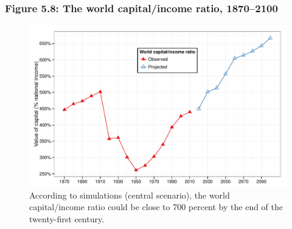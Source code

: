 \documentclass[t]{beamer}\usepackage[]{graphicx}\usepackage[]{color}
\newenvironment{knitrout}{}{} %
\begin{document}
\begin{frame}[label=Figure_5_8]
\frametitle{Figure 5.8: The world capital/income ratio, 1870--2100}
\begin{figure}[t]
\begin{minipage}[b]{\textwidth}
\centering
\begin{knitrout}\footnotesize
{}\color{fgcolor}

{\centering \includegraphics[width=1\linewidth]{figures/color/Figure_5_8} 

}



\end{knitrout}
\caption{According to simulations (central scenario), the world capital/income ratio could be close to 700 percent by the end of the twenty-first century.}
\end{minipage}
\end{figure}
\end{frame}
\end{document}
